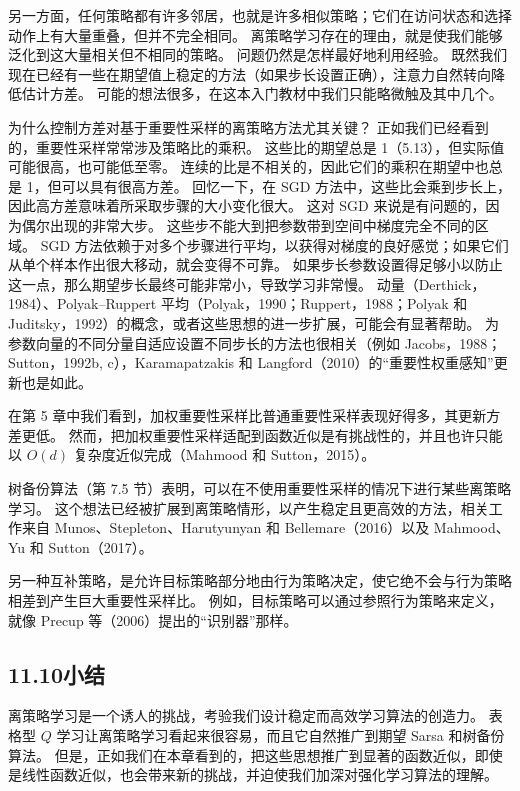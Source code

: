 \documentclass[UTF8, 12pt, fontset=fandol, oneside]{ctexart}
\begin{document}
另一方面，任何策略都有许多邻居，也就是许多相似策略；它们在访问状态和选择动作上有大量重叠，但并不完全相同。
离策略学习存在的理由，就是使我们能够泛化到这大量相关但不相同的策略。
问题仍然是怎样最好地利用经验。
既然我们现在已经有一些在期望值上稳定的方法（如果步长设置正确），注意力自然转向降低估计方差。
可能的想法很多，在这本入门教材中我们只能略微触及其中几个。

为什么控制方差对基于重要性采样的离策略方法尤其关键？
正如我们已经看到的，重要性采样常常涉及策略比的乘积。
这些比的期望总是 1（5.13），但实际值可能很高，也可能低至零。
连续的比是不相关的，因此它们的乘积在期望中也总是 1，但可以具有很高方差。
回忆一下，在 SGD 方法中，这些比会乘到步长上，因此高方差意味着所采取步骤的大小变化很大。
这对 SGD 来说是有问题的，因为偶尔出现的非常大步。
这些步不能大到把参数带到空间中梯度完全不同的区域。
SGD 方法依赖于对多个步骤进行平均，以获得对梯度的良好感觉；如果它们从单个样本作出很大移动，就会变得不可靠。
如果步长参数设置得足够小以防止这一点，那么期望步长最终可能非常小，导致学习非常慢。
动量（Derthick，1984）、Polyak--Ruppert 平均（Polyak，1990；Ruppert，1988；Polyak 和 Juditsky，1992）的概念，或者这些思想的进一步扩展，可能会有显著帮助。
为参数向量的不同分量自适应设置不同步长的方法也很相关（例如 Jacobs，1988；Sutton，1992b, c），Karamapatzakis 和 Langford（2010）的“重要性权重感知”更新也是如此。

在第 5 章中我们看到，加权重要性采样比普通重要性采样表现好得多，其更新方差更低。
然而，把加权重要性采样适配到函数近似是有挑战性的，并且也许只能以 $O(d)$ 复杂度近似完成（Mahmood 和 Sutton，2015）。

树备份算法（第 7.5 节）表明，可以在不使用重要性采样的情况下进行某些离策略学习。
这个想法已经被扩展到离策略情形，以产生稳定且更高效的方法，相关工作来自 Munos、Stepleton、Harutyunyan 和 Bellemare（2016）以及 Mahmood、Yu 和 Sutton（2017）。

另一种互补策略，是允许目标策略部分地由行为策略决定，使它绝不会与行为策略相差到产生巨大重要性采样比。
例如，目标策略可以通过参照行为策略来定义，就像 Precup 等（2006）提出的“识别器”那样。

\subsection*{11.10\quad 小结}

离策略学习是一个诱人的挑战，考验我们设计稳定而高效学习算法的创造力。
表格型 $Q$ 学习让离策略学习看起来很容易，而且它自然推广到期望 Sarsa 和树备份算法。
但是，正如我们在本章看到的，把这些思想推广到显著的函数近似，即使是线性函数近似，也会带来新的挑战，并迫使我们加深对强化学习算法的理解。
\end{document}
